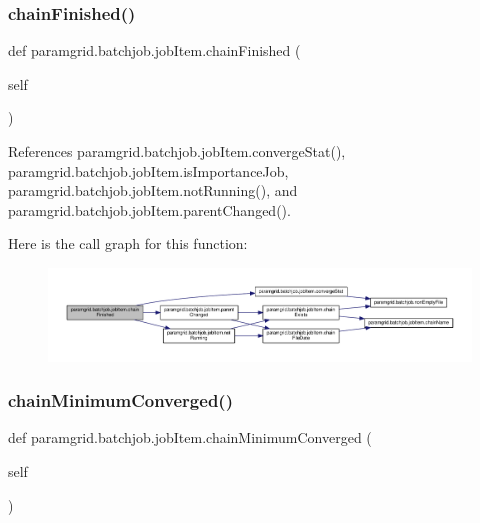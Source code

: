 \subsubsection{\texorpdfstring{chain\+Finished()}{chainFinished()}}
{\footnotesize\ttfamily def paramgrid.\+batchjob.\+job\+Item.\+chain\+Finished (\begin{DoxyParamCaption}\item[{}]{self }\end{DoxyParamCaption})}



References paramgrid.\+batchjob.\+job\+Item.\+converge\+Stat(), paramgrid.\+batchjob.\+job\+Item.\+is\+Importance\+Job, paramgrid.\+batchjob.\+job\+Item.\+not\+Running(), and paramgrid.\+batchjob.\+job\+Item.\+parent\+Changed().

Here is the call graph for this function\+:
\nopagebreak
\begin{figure}[H]
\begin{center}
\leavevmode
\includegraphics[width=350pt]{classparamgrid_1_1batchjob_1_1jobItem_af5ab04f9c7520cac86ab2182b265979e_cgraph}
\end{center}
\end{figure}
\mbox{\label{classparamgrid_1_1batchjob_1_1jobItem_a7c3b8c96fddc1cf62fd8d9b1a3f8cda7}} 
\subsubsection{\texorpdfstring{chain\+Minimum\+Converged()}{chainMinimumConverged()}}
{\footnotesize\ttfamily def paramgrid.\+batchjob.\+job\+Item.\+chain\+Minimum\+Converged (\begin{DoxyParamCaption}\item[{}]{self }\end{DoxyParamCaption})}



